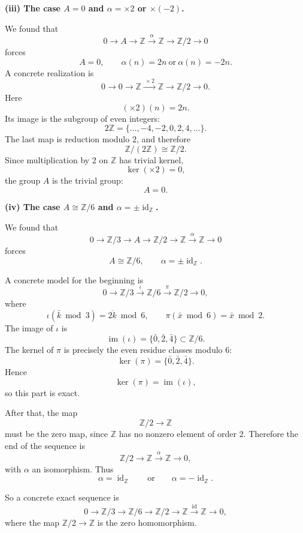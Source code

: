 \begin{solution}
\textbf{(iii) The case \(A=0\) and \(\alpha=\times 2\) or \(\times(-2)\).}

We found that
\[
0\longrightarrow A \longrightarrow \mathbb Z \xrightarrow{\alpha} \mathbb Z \longrightarrow \mathbb Z/2 \longrightarrow 0
\]
forces
\[
A=0,\qquad \alpha(n)=2n \ \text{or}\ \alpha(n)=-2n.
\]
A concrete realization is
\[
0\longrightarrow 0
\longrightarrow \mathbb Z
\xrightarrow{\ \times 2\ }
\mathbb Z
\longrightarrow \mathbb Z/2
\longrightarrow 0.
\]
Here
\[
(\times 2)(n)=2n.
\]
Its image is the subgroup of even integers:
\[
2\mathbb Z=\{\dots,-4,-2,0,2,4,\dots\}.
\]
The last map is reduction modulo \(2\), and therefore
\[
\mathbb Z/(2\mathbb Z)\cong \mathbb Z/2.
\]
Since multiplication by \(2\) on \(\mathbb Z\) has trivial kernel,
\[
\ker(\times 2)=0,
\]
the group \(A\) is the trivial group:
\[
A=0.
\]

\par

\textbf{(iv) The case \(A\cong \mathbb Z/6\) and \(\alpha=\pm\operatorname{id}_{\mathbb Z}\).}

We found that
\[
0\longrightarrow \mathbb Z/3 \longrightarrow A \longrightarrow \mathbb Z/2
\longrightarrow \mathbb Z \xrightarrow{\alpha} \mathbb Z \longrightarrow 0
\]
forces
\[
A\cong \mathbb Z/6,
\qquad
\alpha=\pm\operatorname{id}_{\mathbb Z}.
\]

A concrete model for the beginning is
\[
0\longrightarrow \mathbb Z/3
\xrightarrow{\ \iota\ }
\mathbb Z/6
\xrightarrow{\ \pi\ }
\mathbb Z/2
\longrightarrow 0,
\]
where
\[
\iota(\bar k \bmod 3)=\overline{2k}\bmod 6,
\qquad
\pi(\bar x \bmod 6)=\bar x \bmod 2.
\]
The image of \(\iota\) is
\[
\operatorname{im}(\iota)=\{\bar0,\bar2,\bar4\}\subset \mathbb Z/6.
\]
The kernel of \(\pi\) is precisely the even residue classes modulo \(6\):
\[
\ker(\pi)=\{\bar0,\bar2,\bar4\}.
\]
Hence
\[
\ker(\pi)=\operatorname{im}(\iota),
\]
so this part is exact.

After that, the map
\[
\mathbb Z/2\longrightarrow \mathbb Z
\]
must be the zero map, since \(\mathbb Z\) has no nonzero element of order \(2\). Therefore the end of the sequence is
\[
\mathbb Z/2 \longrightarrow \mathbb Z
\xrightarrow{\ \alpha\ }
\mathbb Z \longrightarrow 0,
\]
with \(\alpha\) an isomorphism. Thus
\[
\alpha=\operatorname{id}_{\mathbb Z}
\qquad\text{or}\qquad
\alpha=-\operatorname{id}_{\mathbb Z}.
\]

So a concrete exact sequence is
\[
0\longrightarrow \mathbb Z/3
\longrightarrow \mathbb Z/6
\longrightarrow \mathbb Z/2
\longrightarrow \mathbb Z
\xrightarrow{\ \operatorname{id}\ }
\mathbb Z
\longrightarrow 0,
\]
where the map \(\mathbb Z/2\to \mathbb Z\) is the zero homomorphism.


\end{solution}
